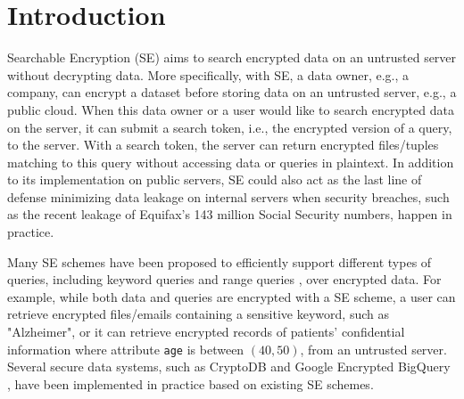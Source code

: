 \section{Introduction}
\label{sec:intro}

Searchable Encryption (SE) \cite{SWP00, CGKO06} aims to search encrypted data on an untrusted server without decrypting data. %
More specifically, with SE, a data owner, e.g., a company, can encrypt a dataset before storing data on an untrusted server, e.g., a public cloud. When this data owner or a user would like to search encrypted data on the server, it can submit a search token, i.e., the encrypted version of a query, to the server. With a search token, the server can return encrypted files/tuples matching to this query without accessing data or queries in plaintext. In addition to its implementation on public servers, SE could also act as the last line of defense minimizing data leakage on internal servers when security breaches, such as the recent leakage of Equifax's 143 million Social Security numbers, happen in practice.

Many SE schemes have been proposed to efficiently support different types of queries, including keyword queries \cite{CGKO06, KPR12, CJJKRS13, KP13, CJJJKRS14, PKVKMCGKB14} and range queries \cite{BW07, SBCSP07, Lu12, KT17}, over encrypted data. For example, while both data and queries are encrypted with a SE scheme, a user can retrieve encrypted files/emails containing a sensitive keyword, such as "Alzheimer", or it  can retrieve encrypted records of patients' confidential information where attribute \texttt{age} is between $(40, 50)$, from an untrusted server. Several secure data systems, such as CryptoDB \cite{PRZB11} and Google Encrypted BigQuery \cite{Bigquery}, have been implemented in practice based on existing SE schemes. 
  